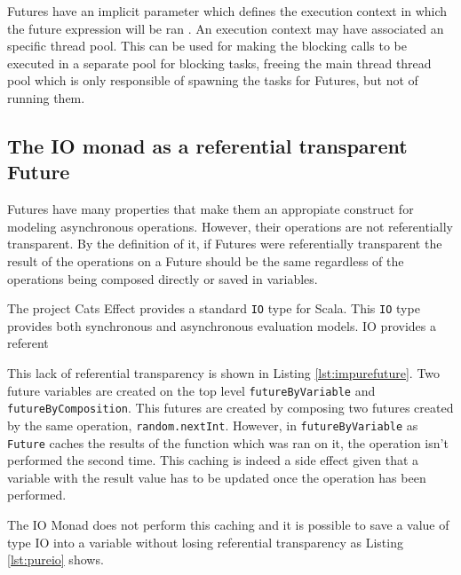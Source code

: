 \documentclass[../main.tex]{subfiles}
\begin{document}
Futures have an implicit parameter which defines the execution context in which
the future expression will be ran \autocite{ScalaScala.concurrent.ExecutionContext}. An
execution context may have associated an specific thread pool. This can be used
for making the blocking calls to be executed in a separate pool for blocking
tasks, freeing the main thread thread pool which is only responsible of spawning the tasks
for Futures, but not of running them.

\subsection{The IO monad as a referential transparent Future}
Futures have many properties that make them an appropiate construct for modeling
asynchronous operations. However, their operations are not referentially transparent.
By the definition of it, if Futures were referentially transparent the result of the operations on a
Future should be the same regardless of the operations being composed
directly or saved in variables.


The project Cats Effect \autocite{CatsHome} provides a standard \texttt{IO} type for
Scala. This \texttt{IO} type provides both synchronous and asynchronous evaluation
models. IO provides a referent




This lack of referential transparency is shown in Listing \ref{lst:impurefuture}. Two
future variables are created on the top level \texttt{futureByVariable} and
\texttt{futureByComposition}. This futures are created by composing two futures
created by the same operation, \texttt{random.nextInt}. However, in
\texttt{futureByVariable} as \texttt{Future} caches the results of the function
which was ran on it, the operation isn't performed the second time. This caching
is indeed a side effect given that a variable with the result value has to
be updated once the operation has been performed.

The IO Monad does not perform this caching and it is possible to save a value of type IO into a
variable without losing referential transparency as Listing \ref{lst:pureio} shows.


\end{document}

